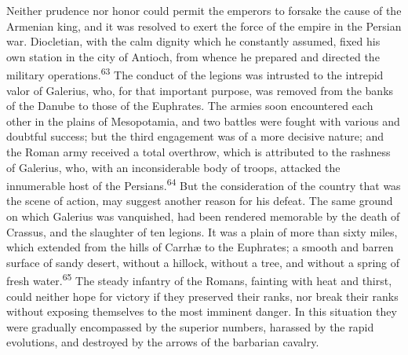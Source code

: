 


Neither prudence nor honor could permit the emperors to forsake
the cause of the Armenian king, and it was resolved to exert the
force of the empire in the Persian war. Diocletian, with the calm
dignity which he constantly assumed, fixed his own station in the
city of Antioch, from whence he prepared and directed the
military operations.\textsuperscript{63} The conduct of the legions was intrusted
to the intrepid valor of Galerius, who, for that important
purpose, was removed from the banks of the Danube to those of the
Euphrates. The armies soon encountered each other in the plains
of Mesopotamia, and two battles were fought with various and
doubtful success; but the third engagement was of a more decisive
nature; and the Roman army received a total overthrow, which is
attributed to the rashness of Galerius, who, with an
inconsiderable body of troops, attacked the innumerable host of
the Persians.\textsuperscript{64} But the consideration of the country that was
the scene of action, may suggest another reason for his defeat.
The same ground on which Galerius was vanquished, had been
rendered memorable by the death of Crassus, and the slaughter of
ten legions. It was a plain of more than sixty miles, which
extended from the hills of Carrhæ to the Euphrates; a smooth and
barren surface of sandy desert, without a hillock, without a
tree, and without a spring of fresh water.\textsuperscript{65} The steady infantry
of the Romans, fainting with heat and thirst, could neither hope
for victory if they preserved their ranks, nor break their ranks
without exposing themselves to the most imminent danger. In this
situation they were gradually encompassed by the superior
numbers, harassed by the rapid evolutions, and destroyed by the
arrows of the barbarian cavalry.

